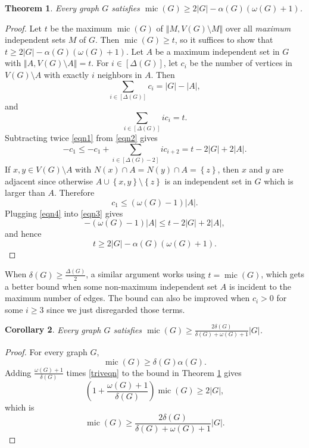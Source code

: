 \documentclass[12pt]{article}
\theoremstyle{plain}
\newtheorem{thm}{Theorem}[section]
\newtheorem{cor}[thm]{Corollary}
\theoremstyle{definition}
\theoremstyle{remark}
\newcommand{\set}[1]{\left\{ #1 \right\}}
\newcommand{\card}[1]{\left|#1\right|}
\newcommand{\size}[1]{\left\Vert#1\right\Vert}
\newcommand{\irange}[1]{\left[#1\right]}
\newcommand{\parens}[1]{\left( #1 \right)}
\newcommand{\mic}{\operatorname{mic}}
\begin{document}
\begin{thm}\label{FajtlowiczMic}
Every graph $G$ satisfies $\mic(G) \ge 2|G| - \alpha(G)(\omega(G) + 1)$.
\end{thm}
\begin{proof}
	Let $t$ be the maximum $\mic(G)$ of $\size{M, V(G) \setminus M}$ over all \emph{maximum} independent sets $M$
	of $G$.   Then $\mic(G) \ge t$, so it suffices to show that $t \ge 2|G| - \alpha(G)(\omega(G) + 1)$.  Let $A$ be a maximum independent set in $G$ with $\size{A,V(G)\setminus A} = t$.  For $i \in \irange{\Delta(G)}$,
	let $c_i$ be the number of vertices in $V(G) \setminus A$ with exactly $i$ neighbors in $A$.  Then
	\begin{equation}\label{eqn1}
		\sum_{i \in \irange{\Delta(G)}} c_i = \card{G} - \card{A},
	\end{equation}
	and
		\begin{equation}\label{eqn2}
		\sum_{i \in \irange{\Delta(G)}} i c_i = t.
		\end{equation}
	Subtracting twice \ref{eqn1} from \ref{eqn2} gives
	\begin{equation}\label{eqn3}
	  -c_1 \le -c_1 + \sum_{i \in \irange{\Delta(G) - 2}} ic_{i+2} = t - 2\card{G} + 2\card{A}.
	\end{equation}
	If $x,y \in V(G) \setminus A$ with $N(x) \cap A = N(y) \cap A = \set{z}$, then $x$ and $y$ are adjacent since otherwise $A \cup \set{x,y} \setminus \set{z}$ is an independent set in $G$ which is larger than $A$.  Therefore
	\begin{equation}\label{eqn4}
		c_1 \le (\omega(G) - 1)|A|.
	\end{equation}
	Plugging \ref{eqn4} into \ref{eqn3} gives
	\[-(\omega(G) - 1)|A| \le t - 2\card{G} + 2\card{A},\]
	and hence
	\[t \ge 2\card{G} - \alpha(G)(\omega(G) + 1).\]
\end{proof}

When $\delta(G) \ge \frac{\Delta(G)}{2}$, a similar argument works using $t = \mic(G)$, which gets a better bound when some non-maximum independent set $A$ is incident to the maximum number of edges.  The bound can also be improved when $c_i > 0$ for some $i \ge 3$ since we just disregarded those terms.

\begin{cor}\label{AlphaGone}
	Every graph $G$ satisfies $\mic(G) \ge \frac{2\delta(G)}{\delta(G) + \omega(G) + 1}\card{G}$.
\end{cor}
\begin{proof}
		For every graph $G$,
		\begin{equation}\label{triveqn}
			\mic(G) \ge \delta(G)\alpha(G).
		\end{equation}
Adding $\frac{\omega(G) + 1}{\delta(G)}$ times \ref{triveqn} to the bound in Theorem \ref{FajtlowiczMic} gives
\[\parens{1 + \frac{\omega(G) + 1}{\delta(G)}}\mic(G) \ge 2\card{G},\]
which is
\[\mic(G) \ge \frac{2\delta(G)}{\delta(G) + \omega(G) + 1}\card{G}.\]
\end{proof}
\end{document}

